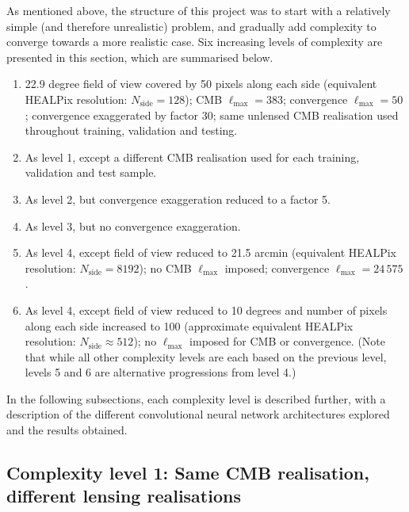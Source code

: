 As mentioned above, the structure of this project was to start with a relatively simple (and therefore unrealistic) problem, and gradually add complexity to converge towards a more realistic case. Six increasing levels of complexity are presented in this section, which are summarised below.
\begin{enumerate}
\item 22.9 degree field of view covered by 50 pixels along each side (equivalent HEALPix resolution: $N_\text{side} = 128$); CMB $\ell_\text{max} = 383$; convergence $\ell_\text{max} = 50$; convergence exaggerated by factor 30; same unlensed CMB realisation used throughout training, validation and testing.
\item As level 1, except a different CMB realisation used for each training, validation and test sample.
\item As level 2, but convergence exaggeration reduced to a factor 5.
\item As level 3, but no convergence exaggeration.
\item As level 4, except field of view reduced to 21.5 arcmin (equivalent HEALPix resolution: $N_\text{side} = 8192$); no CMB $\ell_\text{max}$ imposed; convergence $\ell_\text{max} = 24\,575$.
\item As level 4, except field of view reduced to 10 degrees and number of pixels along each side increased to 100 (approximate equivalent HEALPix resolution: $N_\text{side} \approx 512$); no $\ell_\text{max}$ imposed for CMB or convergence. (Note that while all other complexity levels are each based on the previous level, levels 5 and 6 are alternative progressions from level 4.)
\end{enumerate}

In the following subsections, each complexity level is described further, with a description of the different convolutional neural network architectures explored and the results obtained.

\subsection[Complexity level 1: Same CMB realisation, different lensing realisations~]{Complexity level 1: Same CMB realisation, different lensing realisations}
\label{ml_Sec:v1}

